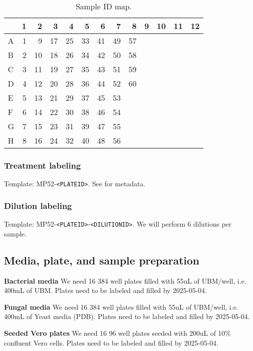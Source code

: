 \documentclass{article}
\begin{document}
\begin{table}
\centering
\begin{tabular}{l|rrrrrrrrrrrr}
 & 1 & 2 & 3 & 4 & 5 & 6 & 7 & 8 & 9 & 10 & 11 & 12\\
\hline
A & 1 & 9 & 17 & 25 & 33 & 41 & 49 & 57 &  &  &  & \\
B & 2 & 10 & 18 & 26 & 34 & 42 & 50 & 58 &  &  &  & \\
C & 3 & 11 & 19 & 27 & 35 & 43 & 51 & 59 &  &  &  & \\
D & 4 & 12 & 20 & 28 & 36 & 44 & 52 & 60 &  &  &  & \\
E & 5 & 13 & 21 & 29 & 37 & 45 & 53 &  &  &  &  & \\
F & 6 & 14 & 22 & 30 & 38 & 46 & 54 &  &  &  &  & \\
G & 7 & 15 & 23 & 31 & 39 & 47 & 55 &  &  &  &  & \\
H & 8 & 16 & 24 & 32 & 40 & 48 & 56 &  &  &  &  & \\
\end{tabular}
\caption{Sample ID map.}
\label{tab:sample-map}
\end{table}

\subsubsection{Treatment labeling}
Template: \textsc{MP52}-\texttt{<PLATEID>}. See  for metadata.

\subsubsection{Dilution labeling}

Template: \textsc{MP52}-\texttt{<PLATEID>}-\texttt{<DILUTIONID>}. 
We will perform 6 dilutions per sample.

\subsection{Media, plate, and sample preparation}
\textbf{Bacterial media} We need 16 384 well plates filled with 55uL of UBM/well, i.e. 400mL of UBM. Plates need to be labeled and filled by 2025-05-04. 

\textbf{Fungal media} We need 16 384 well plates filled with 55uL of UBM/well, i.e. 400mL of Yeast media (PDB). Plates need to be labeled and filled by 2025-05-04.

\textbf{Seeded Vero plates} We need 16 96 well plates seeded with 200uL of 10\% confluent Vero cells. Plates need to be labeled and filled by 2025-05-04.
\end{document}

